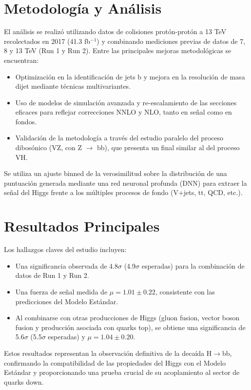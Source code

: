 \documentclass[a4paper,12pt]{article}
\begin{document}
\section{Metodología y Análisis}
El análisis se realizó utilizando datos de colisiones protón-protón a 13 TeV recolectados en 2017 (41.3 fb$^{-1}$) y combinando mediciones previas de datos de 7, 8 y 13 TeV (Run 1 y Run 2). Entre las principales mejoras metodológicas se encuentran:
\begin{itemize}
    \item Optimización en la identificación de jets b y mejora en la resolución de masa dijet mediante técnicas multivariantes.
    \item Uso de modelos de simulación avanzada y re-escalamiento de las secciones eficaces para reflejar correcciones NNLO y NLO, tanto en señal como en fondos.
    \item Validación de la metodología a través del estudio paralelo del proceso dibosónico (VZ, con Z $\rightarrow$ bb), que presenta un final similar al del proceso VH.
\end{itemize}
Se utiliza un ajuste binned de la verosimilitud sobre la distribución de una puntuación generada mediante una red neuronal profunda (DNN) para extraer la señal del Higgs frente a los múltiples procesos de fondo (V+jets, tt, QCD, etc.).

\section{Resultados Principales}
Los hallazgos claves del estudio incluyen:
\begin{itemize}
    \item Una significancia observada de 4.8$\sigma$ (4.9$\sigma$ esperadas) para la combinación de datos de Run 1 y Run 2.
    \item Una fuerza de señal medida de $\mu = 1.01 \pm 0.22$, consistente con las predicciones del Modelo Estándar.
    \item Al combinarse con otras producciones de Higgs (gluon fusion, vector boson fusion y producción asociada con quarks top), se obtiene una significancia de 5.6$\sigma$ (5.5$\sigma$ esperadas) y $\mu = 1.04 \pm 0.20$.
\end{itemize}
Estos resultados representan la observación definitiva de la decaída H$\rightarrow$bb, confirmando la compatibilidad de las propiedades del Higgs con el Modelo Estándar y proporcionando una prueba crucial de su acoplamiento al sector de quarks down.
\end{document}
